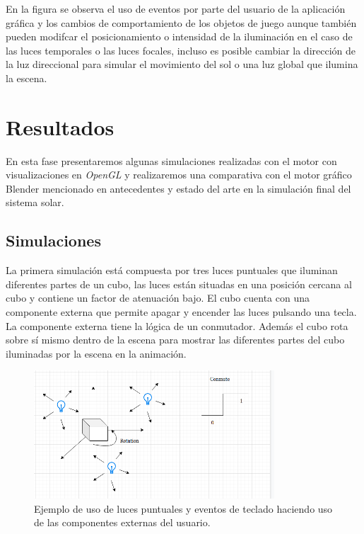 \documentclass[a4paper]{book}
\begin{document}
En la figura se observa el uso de eventos por parte del usuario de la aplicación gráfica y los cambios de comportamiento de los objetos de juego
aunque también pueden modifcar el posicionamiento o intensidad de la iluminación en el caso de las luces temporales o las luces focales, 
incluso es posible cambiar la dirección de la luz direccional para simular el movimiento del sol o una luz global que ilumina la escena.


\cleardoublepage
\chapter{Resultados}

En esta fase presentaremos algunas simulaciones realizadas con el motor con visualizaciones en \textit{OpenGL} y realizaremos una comparativa
con el motor gráfico Blender mencionado en antecedentes y estado del arte en la simulación final del sistema solar.

\section{Simulaciones}
\label{sec:Simulaciones}

La primera simulación está compuesta por tres luces puntuales que iluminan diferentes partes de un cubo, las luces están situadas
en una posición cercana al cubo y contiene un factor de atenuación bajo. El cubo cuenta con una componente externa que permite
apagar y encender las luces pulsando una tecla. La componente externa tiene la lógica de un conmutador. Además el cubo rota sobre
sí mismo dentro de la escena para mostrar las diferentes partes del cubo iluminadas por la escena en la animación.

\begin{figure}[H]
    \centering
    \includegraphics[width=9cm, keepaspectratio]{img/SimpleCube.png}
    \caption{Ejemplo de uso de luces puntuales y eventos de teclado haciendo uso de las componentes externas del usuario.}
    \label{SimpleCube}
\end{figure}
\end{document}
